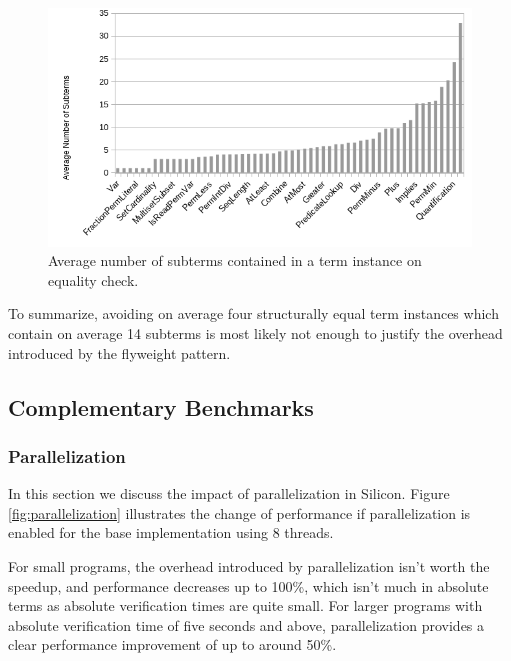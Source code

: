 \documentclass[11pt]{article}
\begin{document}
    \begin{figure}[H]
        \includegraphics[width=\linewidth]{node-count.png}
        \caption{Average number of subterms contained in a term instance on equality check.}
        \label{fig:node-count}
    \end{figure}

    To summarize, avoiding on average four structurally equal term instances which contain
    on average 14 subterms is most likely not enough to justify the overhead introduced by the flyweight pattern.


    \subsection{Complementary Benchmarks}

    \subsubsection{Parallelization}

    In this section we discuss the impact of
    parallelization in Silicon.
    Figure \ref{fig:parallelization} illustrates the change of performance
    if parallelization is enabled for the base implementation using 8 threads.

    For small programs, the overhead introduced by parallelization isn't worth
    the speedup, and performance decreases up to 100\%, which isn't much in absolute
    terms as absolute verification times are quite small. For larger programs
    with absolute verification time of five seconds and above, parallelization
    provides a clear performance improvement of up to around 50\%.
\end{document}
